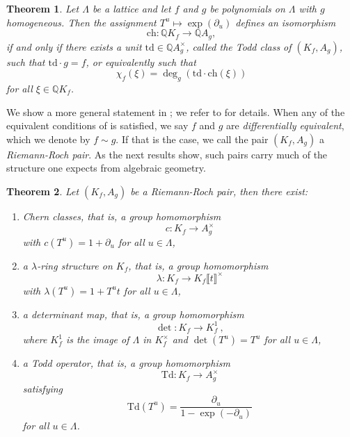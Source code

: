 \documentclass[oneside]{amsart}
\theoremstyle{plain}
\newtheorem{theorem}{Theorem}[section]
\theoremstyle{definition}
\newcommand{\Q}{{\mathbb{Q}}}
\newcommand{\ch}{{\mathrm{ch}}}
\newcommand{\td}{{\mathrm{td}}}
\newcommand{\Td}{{\mathrm{Td}}}
\begin{document}
\begin{theorem}
    \label{intro_thm:Chern character descends}
    Let $\Lambda$ be a lattice and let $f$ and $g$ be polynomials on $\Lambda$ with $g$ homogeneous.
    Then the assignment $T^u \mapsto \exp(\partial_u)$ defines an isomorphism
    \[
        \ch \colon \Q K_f\to \Q A_g,
    \]
    if and only if there exists a unit $\td \in \Q A_g^\times$, called the \emph{Todd class} of $(K_f, A_g)$, such that $\td \cdot g=f$, or equivalently such that
    \[
        \chi_f(\xi)= \deg_g(\td\cdot\ch(\xi))
    \]
    for all $\xi\in \Q K_f$.
\end{theorem}
We show a more general statement in ; we refer to  for details. When any of the equivalent conditions of  is satisfied, we say $f$ and $g$ are \emph{differentially equivalent}, which we denote by $f \sim g$.
If that is the case, we call the pair $(K_f, A_g)$ a \emph{Riemann-Roch pair}. As the next results show,
such pairs carry much of the structure one expects from algebraic geometry.


\begin{theorem}
\label{intro_thm:Operators}
Let $(K_f, A_g)$ be a Riemann-Roch pair, then there exist:
\begin{enumerate}
    \item \emph{Chern classes}, that is, a group homomorphism
    \[
        c\colon K_f \to A_g^\times
    \]
    with $c(T^u)=1+\partial_u$ for all $u\in \Lambda$,
    
    \item a \emph{$\lambda$-ring structure} on $K_f$, that is, a group homomorphism
    \[
        \lambda \colon K_f\to K_f\llbracket t\rrbracket^\times
    \]
    with $\lambda(T^u)=1+T^u t$ for all $u\in \Lambda$,


    \item a \emph{determinant map}, that is, a group  homomorphism
    \[
        \det \colon K_f\to K_f^1 \ ,
    \]
    where $K_f^1$ is the image of $\Lambda$ in $K_f^\times$ and $\det(T^u)=T^u$ for all $u\in \Lambda$,

    \item a \emph{Todd operator}, that is, a group homomorphism
    \[
        \Td\colon K_f\to A_g^\times
    \]
    satisfying
    \[
        \Td(T^u)= \frac{\partial_u}{1-\exp(-\partial_u)}
    \]
    for all $u\in \Lambda$.
\end{enumerate}
\end{theorem}
\end{document}
